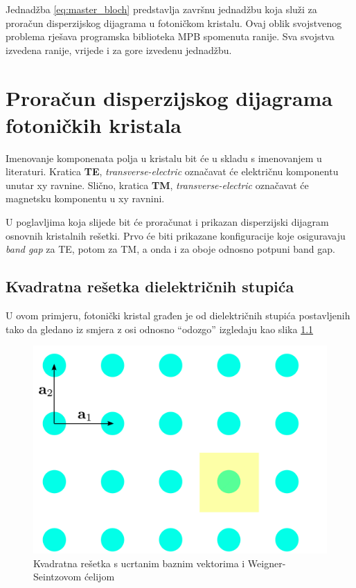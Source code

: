\documentclass[utf8, seminar]{fer}
\begin{document}
Jednadžba \ref{eq:master_bloch} predstavlja završnu jednadžbu koja služi za
proračun disperzijskog dijagrama u fotoničkom kristalu. Ovaj oblik
svojstvenog problema rješava programska biblioteka MPB spomenuta ranije. Sva
svojstva izvedena ranije, vrijede i za gore izvedenu jednadžbu.

\chapter{Proračun disperzijskog dijagrama fotoničkih kristala}

Imenovanje komponenata polja u kristalu bit će u skladu s imenovanjem u
literaturi. Kratica \textbf{TE},
\textit{transverse-electric} označavat će električnu komponentu unutar xy ravnine.
Slično, kratica \textbf{TM}, \textit{transverse-electric} označavat će magnetsku
komponentu u xy ravnini.

U poglavljima koja slijede bit će proračunat i prikazan disperzijski dijagram
osnovnih kristalnih rešetki. Prvo će biti prikazane konfiguracije koje
osiguravaju \textit{band gap} za TE, potom za TM, a onda i za oboje odnosno
potpuni band gap.

\section{Kvadratna rešetka dielektričnih stupića}

U ovom primjeru, fotonički kristal građen je od dielektričnih stupića
postavljenih tako da gledano iz smjera z osi odnosno ``odozgo'' izgledaju kao
slika \ref{fig:square_lattice}

\begin{figure}[h]
	\centering
	\includegraphics[width = 1.0\linewidth]{./images/square_lattice.pdf}
	\caption{Kvadratna rešetka s ucrtanim baznim vektorima i Weigner-Seintzovom
	ćelijom}
	\label{fig:square_lattice}
\end{figure}
\end{document}
